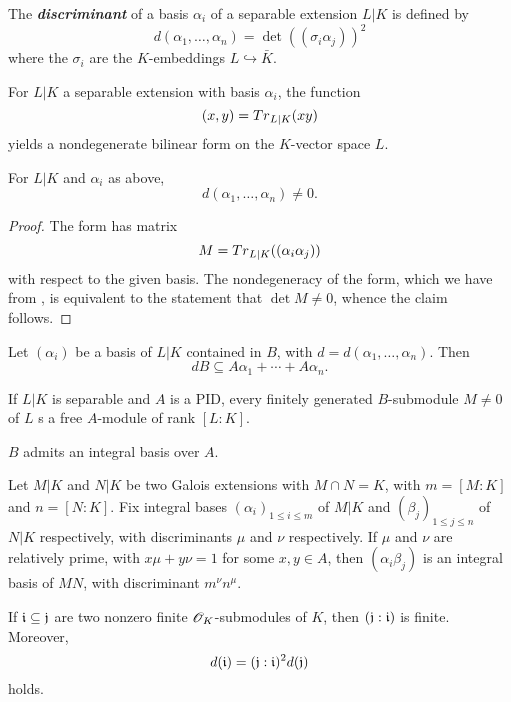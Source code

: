 \begin{definition}
  The \emph{\textbf{discriminant}} of a basis $\alpha_i$ of a separable
  extension $L | K$ is defined by
  \[ d(\alpha_1,\ldots,\alpha_n) = \det((\sigma_i\alpha_j))^2 \] where the
  $\sigma_i$ are the $K$-embeddings $L \hookrightarrow {\bar{K}}$.
\end{definition}


\begin{prop}{\label{trace-form-bilinear}}
  For $L|K$ a separable extension with basis $\alpha_i$, the function
  \[(x,y) = {\mathnormal{Tr}}_{L|K}(xy)\] yields a nondegenerate bilinear form on the $K$-vector
  space $L$.
\end{prop}

\begin{corollary} For $L|K$ and $\alpha_i$ as above,
  \[d(\alpha_1,\ldots,\alpha_n) \neq 0.\]
\end{corollary}

\begin{proof}
  The form has matrix
  \[ M = {\mathnormal{Tr}}_{L|K}((\alpha_i\alpha_j)) \] with respect to the given basis. The
  nondegeneracy of the form, which we have from , is
  equivalent to the statement that $\det M \ne 0$, whence the claim follows.
\end{proof}

\begin{lemma}
  Let $(\alpha_i)$ be a basis of $L|K$ contained in $B$, with $d =
  d(\alpha_1,\ldots,\alpha_n)$. Then
  \[ dB \subseteq A\alpha_1 + \cdots + A\alpha_n. \]
\end{lemma}

\begin{prop}
  If $L|K$ is separable and $A$ is a PID, every finitely generated $B$-submodule
  $M\ne 0$ of $L$ s a free $A$-module of rank $[L:K]$.
\end{prop}
\begin{corollary}
  $B$ admits an integral basis over $A$.
\end{corollary}

\begin{prop}
  Let $M|K$ and $N|K$ be two Galois extensions with $M \cap N = K$, with $m =
  [M:K]$ and $n = [N:K]$. Fix integral bases $(\alpha_i)_{1 \le i \le m}$ of
  $M|K$ and $(\beta_j)_{1 \le j \le n}$ of $N|K$ respectively, with
  discriminants $\mu$ and $\nu$ respectively. If $\mu$ and $\nu$ are relatively
  prime, with $x\mu+y\nu = 1$ for some $x,y\in A$, then $(\alpha_i\beta_j)$ is
  an integral basis of $MN$, with discriminant $m^\nu n^\mu$.
\end{prop}


\begin{prop}
  If $\mathfrak{i} \subseteq \mathfrak{j}$ are two nonzero finite $\mathscr{O}_K$-submodules of $K$, then
  $(\mathfrak{j}:\mathfrak{i})$ is finite. Moreover,
  \[ d(\mathfrak{i}) = (\mathfrak{j}:\mathfrak{i})^2d(\mathfrak{j}) \] holds.
\end{prop}
